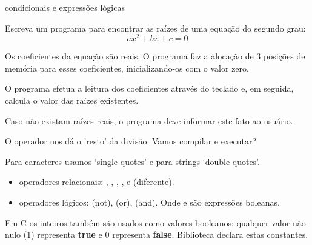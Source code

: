 \documentclass{beamer}
\begin{document}
\begin{frame}{condicionais e expressões lógicas}

  Escreva um programa para encontrar as raízes de uma equação do
  segundo grau:
  \[ a x^2 + b x + c = 0 \]

  Os coeficientes da equação são reais. O programa faz a alocação de 3
  posições de memória para esses coeficientes, inicializando-os com o
  valor zero.
  
  O programa efetua a leitura dos coeficientes através do teclado e,
  em seguida, calcula o valor das raízes existentes.
  
  Caso não existam raízes reais, o programa deve informar este fato ao
  usuário.

  \framebreak

  

  \framebreak

  

  O operador \ilcode{\%} nos dá o 'resto' da divisão. Vamos compilar e
  executar?

  \framebreak
  
  

  Para caracteres usamos `single quotes' e para strings `double
  quotes'.

  \framebreak

  \begin{itemize}
  \item operadores relacionais: , ,
    , ,  e  (diferente).

  \item operadores lógicos:  (not),  (or),
     (and). Onde  e  são
    expressões boleanas.
  \end{itemize}

  Em C os inteiros também são usados como valores booleanos: qualquer
  valor não nulo (1) representa \textbf{true} e 0 representa
  \textbf{false}. Biblioteca  declara estas
  constantes.
  
  
  \framebreak

  

\end{frame}
\end{document}
